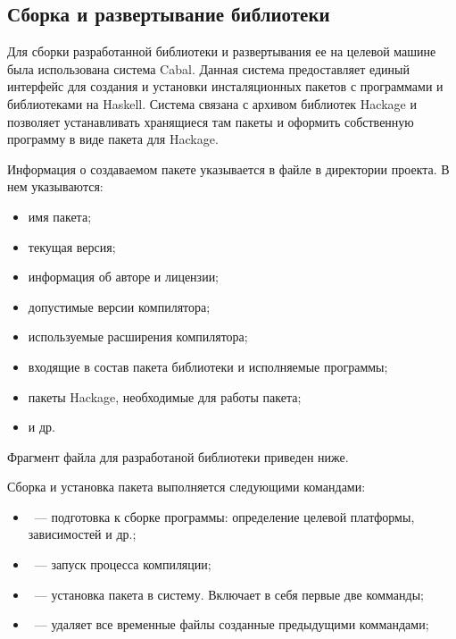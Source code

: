 \subsection{Сборка и развертывание библиотеки}

Для сборки разработанной библиотеки и развертывания ее на целевой машине была использована система Cabal. Данная система предоставляет единый интерфейс для создания и установки инсталяционных пакетов с программами и библиотеками на Haskell. Система связана с архивом библиотек Hackage и позволяет устанавливать хранящиеся там пакеты и оформить собственную программу в виде пакета для Hackage.

Информация о создаваемом пакете указывается в файле  в директории проекта. В нем указываются:
    
\begin{itemize}
\item имя пакета;

\item текущая версия;

\item информация об авторе и лицензии;

\item допустимые версии компилятора;

\item используемые расширения компилятора;

\item входящие в состав пакета библиотеки и исполняемые программы;

\item пакеты Hackage, необходимые для работы пакета;

\item и др.

\end{itemize}
    
    
Фрагмент файла  для разработаной библиотеки приведен ниже.



Сборка и установка пакета выполняется следующими командами:

\begin{itemize}
\item {}~--- подготовка к сборке программы: определение целевой платформы, зависимостей и др.;

\item {}~--- запуск процесса компиляции;

\item {}~--- установка пакета в систему. Включает в себя первые две комманды;

\item {}~--- удаляет все временные файлы созданные предыдущими коммандами;

\end{itemize}
    
